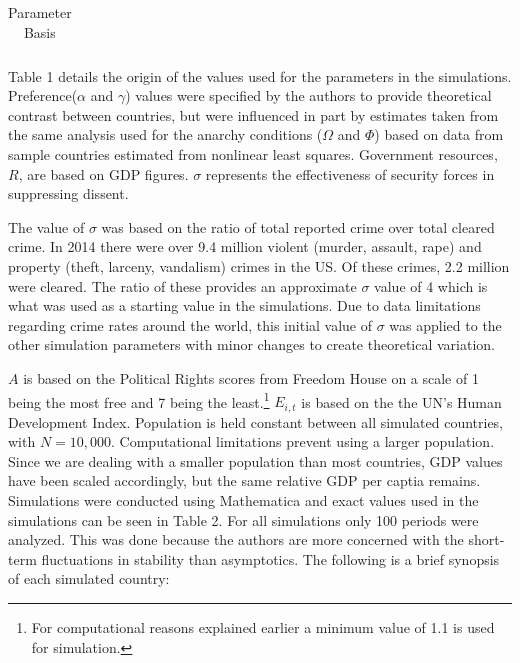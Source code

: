 \documentclass[12pt]{article}
\begin{document}
\begin{spacing}{1.5}
\begin{table}[]
\begin{tabular}{llll}
\end{tabular}
\caption{Parameter Basis}
\end{table}

Table 1 details the origin of the values used for the parameters in the simulations. Preference($\alpha$ and $\gamma$) values were specified by the authors to provide theoretical contrast between countries, but were influenced in part by estimates taken from the same analysis used for the anarchy conditions ($\Omega$ and $\Phi$) based on data from sample countries estimated from nonlinear least squares. Government resources, $R$, are based on GDP figures. $\sigma$ represents the effectiveness of security forces in suppressing dissent. 

The value of $\sigma$ was based on the ratio of total reported crime over total cleared crime. In 2014 there were over 9.4 million violent (murder, assault, rape) and property (theft, larceny, vandalism) crimes in the US. Of these crimes, 2.2 million were cleared. The ratio of these provides an approximate $\sigma$ value of 4 which is what was used as a starting value in the simulations. Due to data limitations regarding crime rates around the world, this initial value of $\sigma$ was applied to the other simulation parameters with minor changes to create theoretical variation. 


$A$ is based on the Political Rights scores from Freedom House on a scale of 1 being the most free and 7 being the least.\footnote{For computational reasons explained earlier a minimum value of 1.1 is used for simulation.} $E_{i,t}$ is based on the the UN's Human Development Index. Population is held constant between all simulated countries, with $N=10,000$. Computational limitations prevent using a larger population. Since we are dealing with a smaller population than most countries, GDP values have been scaled accordingly, but the same relative GDP per captia remains. Simulations were conducted using Mathematica and exact values used in the simulations can be seen in Table 2. For all simulations only 100 periods were analyzed. This was done because the authors are more concerned with the short-term fluctuations in stability than asymptotics. The following is a brief synopsis of each simulated country:  
 

\end{spacing}
\end{document}
